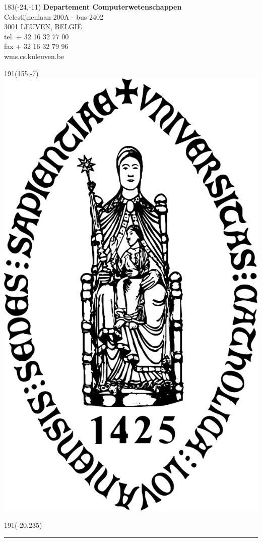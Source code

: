 \documentclass[12pt,a4paper,oneside]{book}
\begin{document}
%
\begin{textblock}{183}(-24,-11)
\textblockcolour{}
\flushright
\fontsize{7}{7.5}\selectfont
\textbf{Departement Computerwetenschappen}\\
Celestijnenlaan 200A - bus 2402\\
3001 LEUVEN, BELGI\"{E}\\
tel. + 32 16 32 77 00\\
fax + 32 16 32 79 96\\
wms.cs.kuleuven.be\\
\end{textblock}
%
\begin{textblock}{191}(155,-7)
\textblockcolour{}
\includegraphics*[height=16.5truemm]{sedes}
\end{textblock}
%
\begin{textblock}{191}(-20,235)
{\color{bluetitle}\rule{544pt}{55pt}}
\end{textblock}
\end{document}
